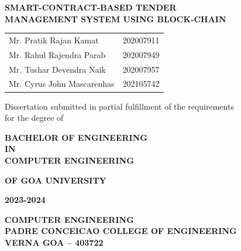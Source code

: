 \documentclass[12pt]{article}
\begin{document}
\vspace*{\fill}

\begin{center}

{\Large \textbf{SMART-CONTRACT-BASED TENDER}}\\[0.5cm]
{\Large \textbf{MANAGEMENT SYSTEM USING BLOCK-CHAIN}}

\vspace{1cm}

\begin{tabular}{ll}
Mr. Pratik Rajan Kamat & 202007911 \\
Mr. Rahul Rajendra Parab & 202007949 \\
Mr. Tushar Devendra Naik & 202007957 \\
Mr. Cyrus John Mascarenhas & 202105742 \\
\end{tabular}

\vspace{1.5cm}

{\large Dissertation submitted in partial fulfillment of the requirements}\\
{\large for the degree of}

\vspace{0.5cm}

{\Large \textbf{BACHELOR OF ENGINEERING}}\\
{\Large \textbf{IN}}\\
{\Large \textbf{COMPUTER ENGINEERING}}

\vspace{0.5cm}

{\large \textbf{OF GOA UNIVERSITY}}

\vspace{1cm}


\vspace{1cm}

{\Large \textbf{2023-2024}}

\vspace{1cm}

{\large \textbf{COMPUTER ENGINEERING}}\\
{\large \textbf{PADRE CONCEICAO COLLEGE OF ENGINEERING}}\\
{\large \textbf{VERNA GOA – 403722}}

\end{center}

\vspace*{\fill}
\end{document}
